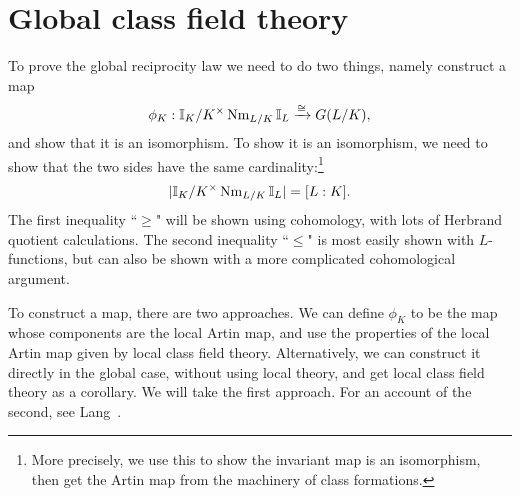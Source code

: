 \chapter{Global class field theory}
To prove the global reciprocity law we need to do two things, namely construct a map
\[
\phi_K:\mathbb{I}_K/K^{\times}\operatorname{Nm}_{L/K}\mathbb{I}_L\xrightarrow{\cong} G(L/K),
\]
and show that it is an isomorphism. To show it is an isomorphism, we need to show that the two sides have the same cardinality:\footnote{More precisely, we use this to show the invariant map is an isomorphism, then get the Artin map from the machinery of class formations.}
\[
|\mathbb{I}_K/K^{\times}\operatorname{Nm}_{L/K}\mathbb{I}_L|= [L:K].
\]
The first inequality ``$\ge$" will be shown using cohomology, with lots of Herbrand quotient calculations. The second inequality ``$\le$" is most easily shown with $L$-functions, but can also be shown with a more complicated cohomological argument.

To construct a map, there are two approaches. We can define $\phi_K$ to be the map whose components are the local Artin map, and use the properties of the local Artin map given by local class field theory. Alternatively, we can construct it directly in the global case, without using local theory, and get local class field theory as a corollary. We will take the first approach. For an account of the second, see Lang~\cite{La94}.
